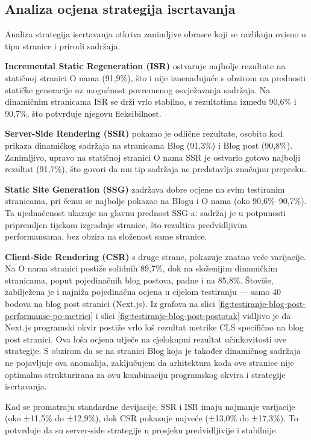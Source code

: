 \subsection{Analiza ocjena strategija iscrtavanja}

Analiza strategija iscrtavanja otkriva zanimljive obrasce koji se razlikuju ovisno o tipu stranice i prirodi sadržaja.

\textbf{Incremental Static Regeneration (ISR)} ostvaruje najbolje rezultate na statičnoj stranici O nama (91,9\%), što i nije iznenađujuće s obzirom na prednosti statičke generacije uz mogućnost povremenog osvježavanja sadržaja. Na dinamičnim stranicama ISR se drži vrlo stabilno, s rezultatima između 90,6\% i 90,7\%, što potvrđuje njegovu fleksibilnost.

\textbf{Server-Side Rendering (SSR)} pokazao je odlične rezultate, osobito kod prikaza dinamičkog sadržaja na stranicama Blog (91,3\%) i Blog post (90,8\%). Zanimljivo, upravo na statičnoj stranici O nama SSR je ostvario gotovo najbolji rezultat (91,7\%), što govori da mu tip sadržaja ne predstavlja značajnu prepreku.

\textbf{Static Site Generation (SSG)} zadržava dobre ocjene na svim testiranim stranicama, pri čemu se najbolje pokazao na Blogu i O nama (oko 90,6\%–90,7\%). Ta ujednačenost ukazuje na glavnu prednost SSG-a: sadržaj je u potpunosti pripremljen tijekom izgradnje stranice, što rezultira predvidljivim performansama, bez obzira na složenost same stranice.

\textbf{Client-Side Rendering (CSR)} s druge strane, pokazuje znatno veće varijacije. Na O nama stranici postiže solidnih 89,7\%, dok na složenijim dinamičkim stranicama, poput pojedinačnih blog postova, padne i na 85,8\%. Štoviše, zabilježena je i najniža pojedinačna ocjena u cijelom testiranju — samo 40 bodova na blog post stranici (Next.js). Iz grafova
na slici \ref{fig:testiranje-blog-post-performanse-po-metrici} i slici \ref{fig:testiranje-blog-post-postotak} vidljivo je da Next.js programski okvir postiže vrlo loš rezultat metrike CLS specifično na blog post stranici. Ova loša ocjena utječe na cjelokupni rezultat učinkovitosti ove strategije. S obzirom da se na stranici Blog koja je također dinamičnog sadržaja ne pojavljuje ova anomalija, zaključujem da arhitektura koda ove stranice nije optimalno strukturirana za ovu kombinaciju programskog okvira i strategije iscrtavanja.

Kad se promatraju standardne devijacije, SSR i ISR imaju najmanje varijacije (oko ±11,5\% do ±12,9\%), dok CSR pokazuje najveće (±13,0\% do ±17,3\%). To potvrđuje da su server-side strategije u prosjeku predvidljivije i stabilnije.

